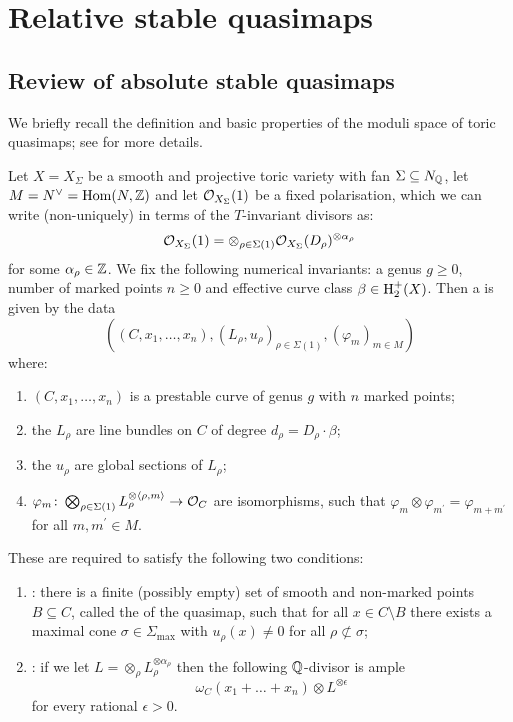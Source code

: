 \section{Relative stable quasimaps} \label{Section relative stable quasimaps}

\subsection{Review of absolute stable quasimaps} \label{Subsection stable quasimaps}
We briefly recall the definition and basic properties of the moduli space of toric quasimaps; see \cite{CF-K} for more details.
\begin{definition}[{\cite[Definition 3.1.1]{CF-K}}] Let $X= X_{\Sigma}$ be a smooth and projective toric variety with fan $\Sigma \subseteq N_{\mathbb{Q}}$, let $M = N^\vee = \operatorname{Hom}(N,\mathbb{Z})$ and let $\mathcal{O}_{X_\Sigma}(1)$ be a fixed polarisation, which we can write (non-uniquely) in terms of the $T$-invariant divisors as:
\begin{equation*} \mathcal{O}_{X_\Sigma}(1) = \otimes_{\rho \in \Sigma(1)} \mathcal{O}_{X_\Sigma}(D_\rho)^{\otimes \alpha_\rho} \end{equation*}
for some $\alpha_\rho \in \mathbb{Z}$. We fix the following numerical invariants: a genus $g \geq 0$, number of marked points $n \geq 0$ and effective curve class $\beta \in \operatorname{H}_2^+(X)$. Then a  is given by the data
\begin{equation*} ((C,x_1,\ldots,x_n), (L_\rho,u_\rho)_{\rho \in \Sigma(1)}, (\varphi_m)_{m \in M}) \end{equation*}
where:
\begin{enumerate}
\item $(C,x_1,\ldots,x_n)$ is a prestable curve of genus $g$ with $n$ marked points;
\item the $L_\rho$ are line bundles on $C$ of degree $d_\rho = D_\rho \cdot \beta$;
\item the $u_\rho$ are global sections of $L_\rho$;
\item $\varphi_m \colon \bigotimes_{\rho \in \Sigma(1)} L_\rho^{\otimes \langle \rho, m \rangle} \rightarrow \mathcal{O}_C$ are isomorphisms, such that $\varphi_{m} \otimes \varphi_{m^\prime} = \varphi_{m + m^\prime}$ for all $m, m^\prime \in M$.
\end{enumerate}
These are required to satisfy the following two conditions:
\begin{enumerate}
\item {}: there is a finite (possibly empty) set of smooth and non-marked points $B \subseteq C$, called the  of the quasimap, such that for all $x \in C \setminus B$ there exists a maximal cone $\sigma \in \Sigma_{\operatorname{max}}$ with $u_\rho(x) \neq 0$ for all $\rho \not\subset \sigma$;
\item {}: if we let $L = \otimes_\rho L_\rho^{\otimes \alpha_\rho}$ then the following $\mathbb{Q}$-divisor is ample
\begin{equation*} \omega_C(x_1 + \ldots + x_n)\otimes L^{\otimes \epsilon} \end{equation*}
for every rational $\epsilon > 0$.
\end{enumerate}
\end{definition}
